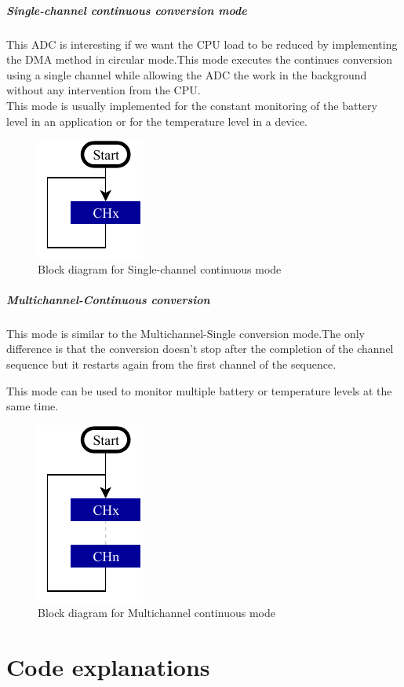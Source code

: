 \documentclass[a4paper, 11pt, openany, oneside, english]{book}
\begin{document}
\newpage

\paragraph{Single-channel continuous conversion mode}
This ADC is interesting if we want the CPU load to be reduced by implementing the DMA  method in circular mode.This mode executes the  continues conversion using a single channel while allowing the ADC the work in the background without any intervention from the CPU.\\

This mode is usually implemented for the constant monitoring of the battery level in an application or for the temperature level in a device. 


\begin{figure}[b] %
\centering
\includegraphics[width= 0.2\linewidth]{HS_STM32-single-channel_single_continuous.pdf}
\caption{Block diagram for Single-channel continuous mode}
\end{figure}

\newpage

\paragraph{Multichannel-Continuous conversion}

This mode is similar to the Multichannel-Single conversion mode.The only difference is that the conversion doesn't stop after the completion of the channel sequence but it restarts again from the first channel of the sequence.\newline

This mode can be used to monitor multiple battery or temperature levels at the same time.


\begin{figure}[b]
\centering
\includegraphics[width= 0.2\linewidth]{HS_STM32-single-channel_multi-single-continuous.pdf}
\caption{Block diagram for Multichannel continuous mode}
\end{figure}

\newpage
\chapter{Code explanations}

\renewcommand\listoflistingscaption{List of source codes}
\listoflistings
\end{document}
